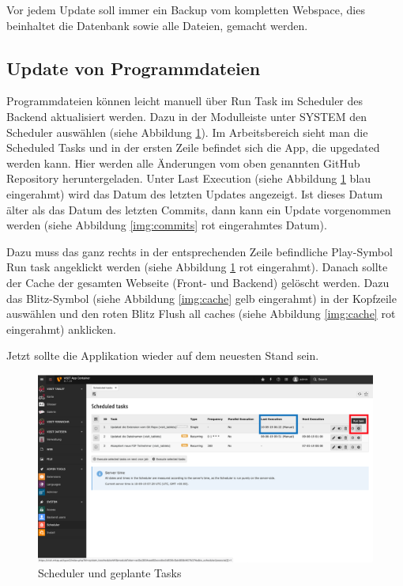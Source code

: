 Vor jedem Update soll immer ein Backup vom kompletten Webspace, dies beinhaltet die Datenbank sowie alle Dateien, gemacht werden.


\subsection{Update von Programmdateien}

Programmdateien können leicht manuell über \glqq Run Task\grqq{} im Scheduler des Backend aktualisiert werden.
Dazu in der Modulleiste unter SYSTEM den Scheduler auswählen  (siehe Abbildung \ref{img:scheduler}). Im Arbeitsbereich sieht man die Scheduled Tasks und in der ersten Zeile befindet sich die App, die upgedated werden kann. Hier werden alle Änderungen vom oben genannten GitHub Repository heruntergeladen. Unter \glqq Last Execution\grqq{} (siehe Abbildung \ref{img:scheduler} blau eingerahmt) wird das Datum des letzten Updates angezeigt. Ist dieses Datum älter als das Datum des letzten Commits, dann kann ein Update vorgenommen werden (siehe Abbildung \ref{img:commits} rot eingerahmtes Datum).

Dazu muss das ganz rechts in der entsprechenden Zeile befindliche Play-Symbol \glqq Run task\grqq{} angeklickt werden (siehe Abbildung \ref{img:scheduler} rot eingerahmt). Danach sollte der Cache der gesamten Webseite (Front- und Backend) gelöscht werden. Dazu das Blitz-Symbol (siehe Abbildung \ref{img:cache} gelb eingerahmt) in der Kopfzeile auswählen und den roten Blitz \glqq Flush all caches \grqq{} (siehe Abbildung \ref{img:cache} rot eingerahmt) anklicken.

Jetzt sollte die Applikation wieder auf dem neuesten Stand sein.

\begin{figure}[ht!]
\centering
\includegraphics[width=12cm]{Figures/paula/update_prozess/run_task.png}
\caption{Scheduler und geplante Tasks}
\label{img:scheduler}
\end{figure}

